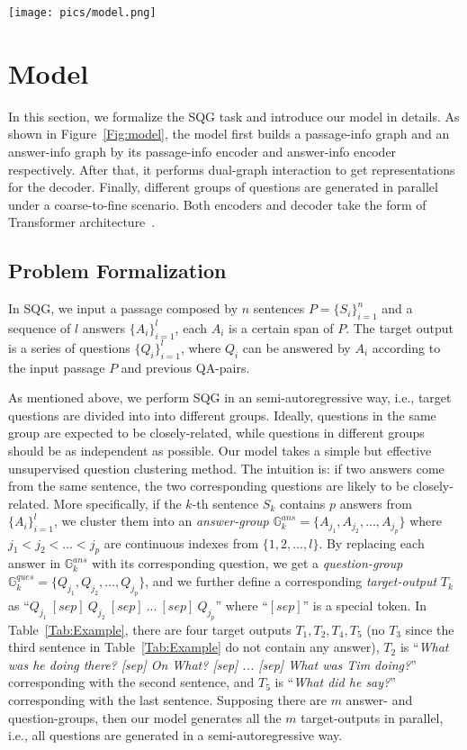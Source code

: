 \documentclass[11pt,a4paper]{article}
\begin{document}
\begin{figure*}
	\centering
	\texttt{[image: pics/model.png]}
	\caption{Architecture of our model. The example is corresponding with Table~\ref{Tab:Example}}
	\label{Fig:model}
\end{figure*}

\section{Model}
In this section, we formalize the SQG task and introduce our model in details. 
As shown in Figure~\ref{Fig:model}, the model first builds a passage-info graph and an answer-info graph by its passage-info encoder and answer-info encoder respectively. 
After that, it performs dual-graph interaction to get representations for the decoder.
Finally, different groups of questions are generated in parallel under a coarse-to-fine scenario. 
Both encoders and decoder take the form of Transformer architecture~\cite{vaswani2017attention}.
  
\subsection{Problem Formalization} \label{Sec:Problem}
In SQG, we input a passage composed by $n$ sentences $P = \{S_i\}_{i=1}^{n}$ and a sequence of $l$ answers $\{A_i\}_{i=1}^{l}$, each $A_i$ is a certain span of $P$. 
The target output is a series of questions $\{Q_i\}_{i=1}^{l}$, where $Q_i$ can be answered by $A_i$ according to the input passage $P$ and previous QA-pairs.

As mentioned above, we perform SQG in an semi-autoregressive way, i.e., target questions are divided into into different groups. Ideally, questions in the same group are expected to be closely-related, while questions in different groups should be as independent as possible. Our model takes a simple but effective unsupervised question clustering method. The intuition is: if two answers come from the same sentence, the two corresponding questions are likely to be closely-related. 
More specifically, if the $k$-th sentence $S_k$ contains $p$ answers from $\{A_i\}_{i=1}^{l}$, we cluster them into an \textit{answer-group} $\mathbb{G}^{ans}_k = \{A_{j_1}, A_{j_2}, ..., A_{j_p}\}$ where $j_1 < j_2 < ... < j_p$ are continuous indexes from $\{1, 2, ..., l\}$. By replacing each answer in $\mathbb{G}^{ans}_k$ with its corresponding question, we get a \textit{question-group} $\mathbb{G}^{ques}_k = \{Q_{j_1}, Q_{j_2}, ..., Q_{j_p}\}$, and we further define a corresponding \textit{target-output} $T_k$ as  ``$Q_{j_1}~[sep]~Q_{j_2}~[sep]~...~ [sep]~Q_{j_p}$'' where ``$[sep]$'' is a special token.
In Table~\ref{Tab:Example}, there are four target outputs $T_1, T_2, T_4, T_5$ (no $T_3$ since the third sentence in Table~\ref{Tab:Example} do not contain any answer), $T_2$ is ``\textit{What was he doing there? [sep] On What? [sep] ... [sep] What was Tim doing?}'' corresponding with the second sentence, and $T_5$ is ``\textit{What did he say?}'' corresponding with the last sentence. 
Supposing there are $m$ answer- and question-groups, then our model generates all the $m$ target-outputs in parallel, i.e., all questions are generated in a semi-autoregressive way.
\end{document}
